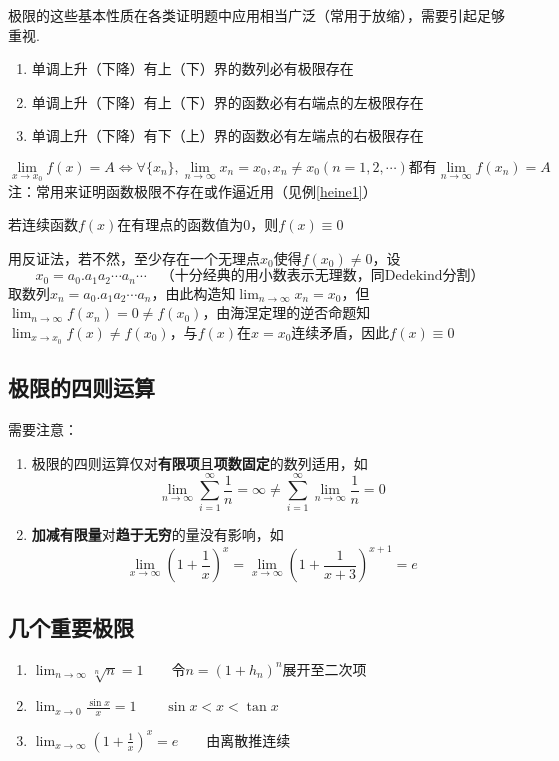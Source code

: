 \par 极限的这些基本性质在各类证明题中应用相当广泛（常用于放缩），需要引起足够重视.
\begin{theorem}[单调有界原理]\mbox{}\par%
\label{thm:monotone_convergence}
\begin{enumerate}
	\item 单调上升（下降）有上（下）界的数列必有极限存在
	\item 单调上升（下降）有上（下）界的函数必有右端点的左极限存在
	\item 单调上升（下降）有下（上）界的函数必有左端点的右极限存在
\end{enumerate}
\end{theorem}
\begin{theorem}[海涅(Heine)定理]
\[\lim_{x\to x_0}f(x)=A\iff\forall\{x_n\},\lim_{n\to\infty}x_n=x_0,x_n\ne x_0(n=1,2,\cdots)\text{都有}\lim_{n\to \infty}f(x_n)=A\]
注：常用来证明函数极限不存在或作逼近用（见例\ref{heine1}）
\end{theorem}
\begin{example}
\label{heine1}
若连续函数$f(x)$在有理点的函数值为$0$，则$f(x)\equiv 0$
\end{example}
\begin{analysis}
用反证法，若不然，至少存在一个无理点$x_0$使得$f(x_0)\ne 0$，设
\[x_0=a_0.a_1a_2\cdots a_n\cdots\quad\text{（十分经典的用小数表示无理数，同Dedekind分割）}\]
取数列$x_n=a_0.a_1a_2\cdots a_n$，由此构造知$\displaystyle\lim_{n\to\infty}x_n=x_0$，但$\displaystyle\lim_{n\to\infty}f(x_n)=0\ne f(x_0)$，由海涅定理的逆否命题知$\displaystyle\lim_{x\to x_0}f(x)\ne f(x_0)$，与$f(x)$在$x=x_0$连续矛盾，因此$f(x)\equiv 0$
\end{analysis}

\subsection{极限的四则运算}
需要注意：
\begin{enumerate}
	\item 极限的四则运算仅对\textbf{有限项}且\textbf{项数固定}的数列适用，如
	\[\displaystyle\lim_{n\to\infty}\sum_{i=1}^\infty\frac{1}{n}=\infty\ne \sum_{i=1}^\infty\lim_{n\to\infty}\frac{1}{n}=0\]
	\item \textbf{加减有限量}对\textbf{趋于无穷}的量没有影响，如
	\[\lim_{x\to\infty}(1+\frac{1}{x})^x=\lim_{x\to\infty}(1+\frac{1}{x+3})^{x+1}=e\]
\end{enumerate}

\subsection{几个重要极限}
\begin{enumerate}
	\item $\displaystyle\lim_{n\to\infty}\sqrt[n]{n}=1\qquad$令$n=(1+h_n)^n$展开至二次项
	\item $\displaystyle\lim_{x\to 0}\frac{\sin x}{x}=1\qquad\sin x<x<\tan x$
	\item $\displaystyle\lim_{x\to\infty}\left(1+\frac{1}{x}\right)^x=e\qquad$由离散推连续
\end{enumerate}

